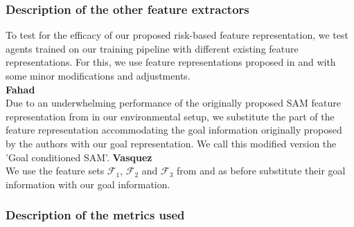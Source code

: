 \subsubsection*{Description of the other feature extractors}
To test for the efficacy of our proposed risk-based feature representation, we test agents trained on our training pipeline with different existing feature representations. For this, we use feature representations proposed in \cite{fahadLearningHowPedestrians2018a} and \cite{vasquezInverseReinforcementLearning2014a} with some minor modifications and adjustments.\\
\textbf{Fahad}\\
Due to an underwhelming performance of the originally proposed SAM feature representation from \cite{fahadLearningHowPedestrians2018a} in our environmental setup, we substitute the part of the feature representation accommodating the goal information originally proposed by the authors with our goal representation. We call this modified version the 'Goal conditioned SAM'.
\textbf{Vasquez}\\
We use the feature sets $\mathcal{F}_1$, $\mathcal{F}_2$ and $\mathcal{F}_3$ from \cite{vasquezInverseReinforcementLearning2014a} and as before substitute their goal information with our goal information.
\subsubsection*{Description of the metrics used}
%

